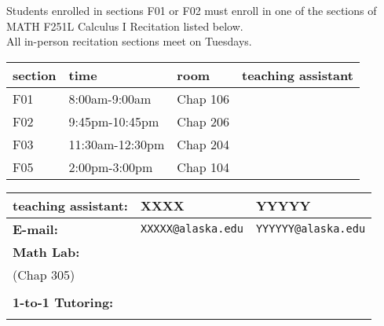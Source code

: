 \documentclass[11pt,fleqn]{article}
\begin{document}
Students enrolled in sections F01 or F02 must enroll in one of the sections of MATH F251L  Calculus I Recitation listed below.\\

All in-person recitation sections meet on Tuesdays.\\

\begin{center}
\vfill

\begin{tabular}{| l | l | l | l |}
\hline
section & time & room& teaching assistant \\
\hline \hline
F01&8:00am-9:00am&Chap 106& \\ \hline
F02&9:45pm-10:45pm&Chap 206&  \\ \hline
F03&11:30am-12:30pm&Chap 204& \\ \hline
F05&2:00pm-3:00pm&Chap 104& \\ \hline
\end{tabular}
\vfill
\begin{tabular}{| l || l | l |}
\hline
\textbf{teaching assistant:}&XXXX&YYYYY\\
\hline \hline
\textbf{E-mail:}&\texttt{XXXXX@alaska.edu} & \texttt{YYYYYY@alaska.edu} \\
\hline
\textbf{Math Lab:}&& \\
(Chap 305)&  & \\
&&\\
\hline
\textbf{1-to-1 Tutoring:}& &  \\
&&\\
\hline
\end{tabular}
\end{center}
\vfill
\end{document}
